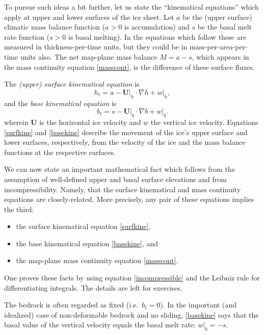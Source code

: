 \documentclass[letterpaper,final,12pt,reqno]{amsart}
\newcommand{\grad}{\nabla}
\begin{document}
To pursue such ideas a bit further, let us state the ``kinematical equations'' which apply at upper and lower surfaces of the ice sheet.  Let $a$ be the (upper surface) climatic mass balance function ($a>0$ is accumulation) and $s$ be the basal melt rate function ($s>0$ is basal melting).  In the equations which follow these are measured in thickness-per-time units, but they could be in mass-per-area-per-time units also.  The net map-plane mass balance $M=a-s$, which appears in the mass continuity equation \eqref{masscont}, is the difference of these surface fluxes.

The \emph{(upper) surface kinematical equation} is 
\begin{equation}
h_t = a - \mathbf{U}\big|_h \cdot \grad h + w\big|_h,  \label{surfkine}
\end{equation}
and the \emph{base kinematical equation} is
\begin{equation}
b_t = s - \mathbf{U}\big|_b \cdot \grad b + w\big|_b.  \label{basekine}
\end{equation}
wherein $\mathbf{U}$ is the horizontal ice velocity and $w$ the vertical ice velocity.  Equations \eqref{surfkine} and \eqref{basekine} describe the movement of the ice's upper surface and lower surfaces, respectively, from the velocity of the ice and the mass balance functions at the respective surfaces.

We can now state an important mathematical fact which follows from the assumption of well-defined upper and basal surface elevations and from incompressibility.  Namely, that the surface kinematical and mass continuity equations are closely-related.  More precisely, any pair of these equations implies the third:
  \begin{itemize}
  \item the surface kinematical equation \eqref{surfkine},
  \item the base kinematical equation \eqref{basekine}, and
  \item the map-plane mass continuity equation \eqref{masscont}.
  \end{itemize}
One proves these facts by using equation \eqref{incompressible} and the Leibniz rule for differentiating integrals.  The details are left for exercises.

The bedrock is often regarded as fixed (i.e.~$b_t=0$).  In the important (and idealized) case of non-deformable bedrock and no sliding, \eqref{basekine} says that the basal value of the vertical velocity equals the basal melt rate: $w\big|_b=-s$.
\end{document}
